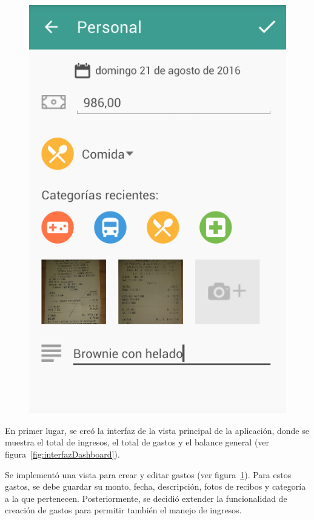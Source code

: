 \begin{figure}[ht]
\begin{minipage}{.5\textwidth}
  \includegraphics[scale=0.4,type=png,ext=.png,read=.png]{imagenes/create_entry}
  \captionsetup{justification=centering}
  \label{fig:interfazCrearEntry}
\end{minipage}
\end{figure}


En primer lugar, se creó la interfaz de la vista principal de la aplicación, donde se muestra el total de ingresos, el total de gastos y el balance general (ver figura~\ref{fig:interfazDashboard}).

Se implementó una vista para crear y editar gastos (ver figura~\ref{fig:interfazCrearEntry}). Para estos gastos, se debe guardar su monto, fecha, descripción, fotos de recibos y categoría a la que pertenecen. Posteriormente, se decidió extender la funcionalidad de creación de gastos para permitir también el manejo de ingresos. 

